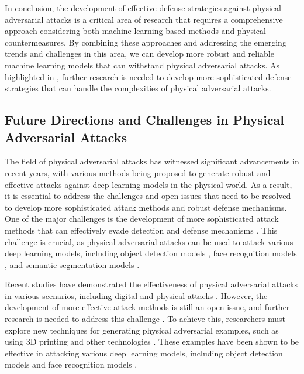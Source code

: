 \documentclass[11pt,a4paper]{article}
\begin{document}
In conclusion, the development of effective defense strategies against physical adversarial attacks is a critical area of research that requires a comprehensive approach considering both machine learning-based methods and physical countermeasures. By combining these approaches and addressing the emerging trends and challenges in this area, we can develop more robust and reliable machine learning models that can withstand physical adversarial attacks. As highlighted in \cite{doi:10.1007/s11263-023-01934-3}, further research is needed to develop more sophisticated defense strategies that can handle the complexities of physical adversarial attacks.


\subsection{Future Directions and Challenges in Physical Adversarial Attacks}


The field of physical adversarial attacks has witnessed significant advancements in recent years, with various methods being proposed to generate robust and effective attacks against deep learning models in the physical world. As a result, it is essential to address the challenges and open issues that need to be resolved to develop more sophisticated attack methods and robust defense mechanisms. One of the major challenges is the development of more sophisticated attack methods that can effectively evade detection and defense mechanisms \cite{doi:10.1007/s11633-019-1211-x}. This challenge is crucial, as physical adversarial attacks can be used to attack various deep learning models, including object detection models \cite{doi:10.1109/access.2023.3321118}, face recognition models \cite{doi:10.1016/j.patcog.2022.109009}, and semantic segmentation models \cite{doi:10.1016/j.eswa.2025.128967}.

Recent studies have demonstrated the effectiveness of physical adversarial attacks in various scenarios, including digital and physical attacks \cite{doi:10.24963/ijcai.2021/694}. However, the development of more effective attack methods is still an open issue, and further research is needed to address this challenge \cite{doi:10.58496/adsa/2024/011}. To achieve this, researchers must explore new techniques for generating physical adversarial examples, such as using 3D printing and other technologies \cite{doi:10.1109/cvpr.2019.00935}. These examples have been shown to be effective in attacking various deep learning models, including object detection models and face recognition models \cite{doi:10.1016/j.jisa.2020.102694}.
\end{document}
